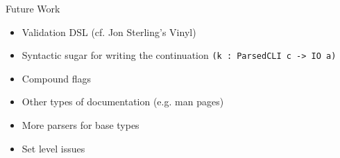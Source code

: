 \documentclass[dvipsnames]{beamer}
\begin{document}
\begin{frame}[fragile]{Future Work}
  \begin{itemize}
    \item Validation DSL (cf. Jon Sterling's Vinyl)
    \item Syntactic sugar for writing the continuation
          \texttt{(k : ParsedCLI c -> IO a)}
    \item Compound flags
    \item Other types of documentation (e.g. man pages)
    \item More parsers for base types
    \item Set level issues
  \end{itemize}
\end{frame}
\end{document}
